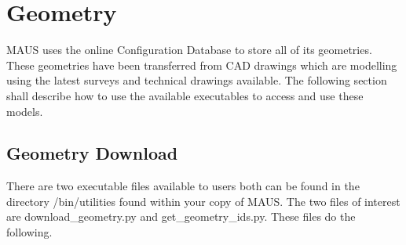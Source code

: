 \chapter{Geometry}
\label{chapter:geometry}
MAUS uses the online Configuration Database to store all of its geometries. These geometries have been transferred from CAD drawings which are
modelling using the latest surveys and technical drawings available. The following section shall describe how to use the available executables to
access and use these models. 

\section{Geometry Download}

There are two executable files available to users both can be found in the directory /bin/utilities found within your copy of MAUS. The two files of
interest are download\_geometry.py and get\_geometry\_ids.py. These files do the following.

